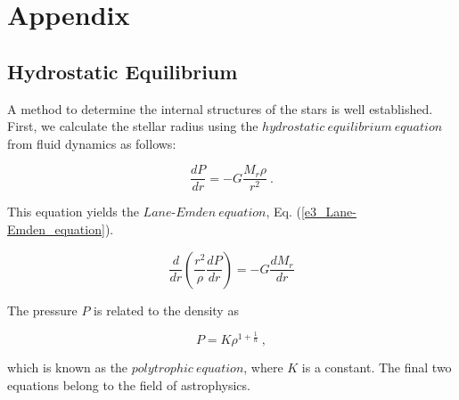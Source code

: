 \documentclass[%
 reprint,
 amsmath,amssymb,
 aps,
]{revtex4-1}
\numberwithin{equation}{section}
\begin{document}
\section{Appendix}
\label{Appendix}

\subsection{Hydrostatic Equilibrium}
\label{Hydrostatic_Equilibrium}

    A method to determine the internal structures of the stars is well established. First, we calculate the stellar radius using the $hydrostatic \ equilibrium \ equation$ \cite{Bradley Carroll} from  fluid dynamics as follows:

        \begin{equation}
            \frac{d P}{d r} = -G \frac{M_{r} \rho}{r^{2}}
            \ .
            \label{e3_hydrostatic_equilibrium_equation}
        \end{equation}

    This equation yields the $Lane$-$Emden \ equation$, Eq. (\ref{e3_Lane-Emden_equation}).

        \begin{equation}
            \frac{d}{d r} \left( \frac{r^{2}}{\rho} \frac{d P}{d r} \right) = -G \frac{d M_{r}}{d r}
            \label{e3_Lane-Emden_equation}
        \end{equation}

    The pressure $P$ is related to the density as

        \begin{equation}
            P = K \rho^{1 + \frac{1}{n}}
            \ ,
            \label{e3_polytropic_equation}
        \end{equation}

    \noindent
    which is known as the $polytrophic \ equation$, where $K$ is a constant. The final two equations belong to the field of astrophysics.

\end{document}
